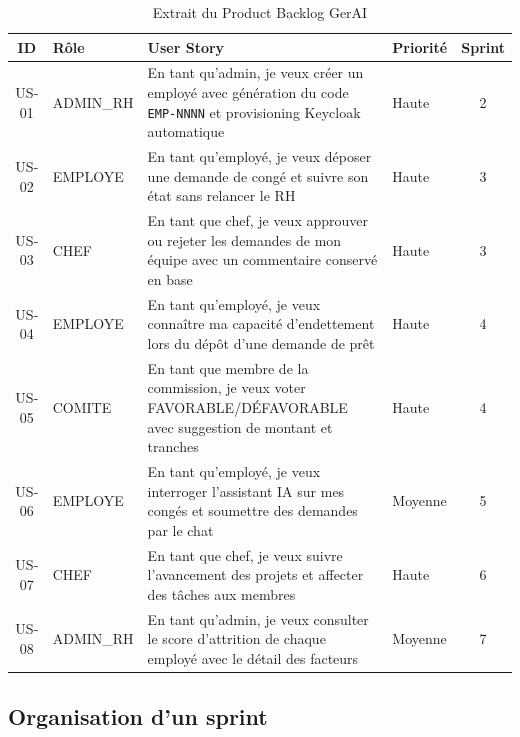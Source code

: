 \begin{table}[H]
\centering
\caption{Extrait du Product Backlog GerAI}
\label{tab:backlog}
\begin{tabularx}{\textwidth}{|C|l|L|l|C|}
\hline
{}\textbf{ID} & \textbf{Rôle} & \textbf{User Story} & \textbf{Priorité} & \textbf{Sprint} \\\hline
{}
US-01 & ADMIN\_RH & En tant qu'admin, je veux créer un employé avec génération du code \texttt{EMP-NNNN} et provisioning Keycloak automatique & Haute & 2 \\\hline
US-02 & EMPLOYE & En tant qu'employé, je veux déposer une demande de congé et suivre son état sans relancer le RH & Haute & 3 \\\hline
{}
US-03 & CHEF & En tant que chef, je veux approuver ou rejeter les demandes de mon équipe avec un commentaire conservé en base & Haute & 3 \\\hline
US-04 & EMPLOYE & En tant qu'employé, je veux connaître ma capacité d'endettement lors du dépôt d'une demande de prêt & Haute & 4 \\\hline
{}
US-05 & COMITE & En tant que membre de la commission, je veux voter FAVORABLE/DÉFAVORABLE avec suggestion de montant et tranches & Haute & 4 \\\hline
US-06 & EMPLOYE & En tant qu'employé, je veux interroger l'assistant IA sur mes congés et soumettre des demandes par le chat & Moyenne & 5 \\\hline
{}
US-07 & CHEF & En tant que chef, je veux suivre l'avancement des projets et affecter des tâches aux membres & Haute & 6 \\\hline
US-08 & ADMIN\_RH & En tant qu'admin, je veux consulter le score d'attrition de chaque employé avec le détail des facteurs & Moyenne & 7 \\\hline
\end{tabularx}
\end{table}

\subsection{Organisation d'un sprint}


